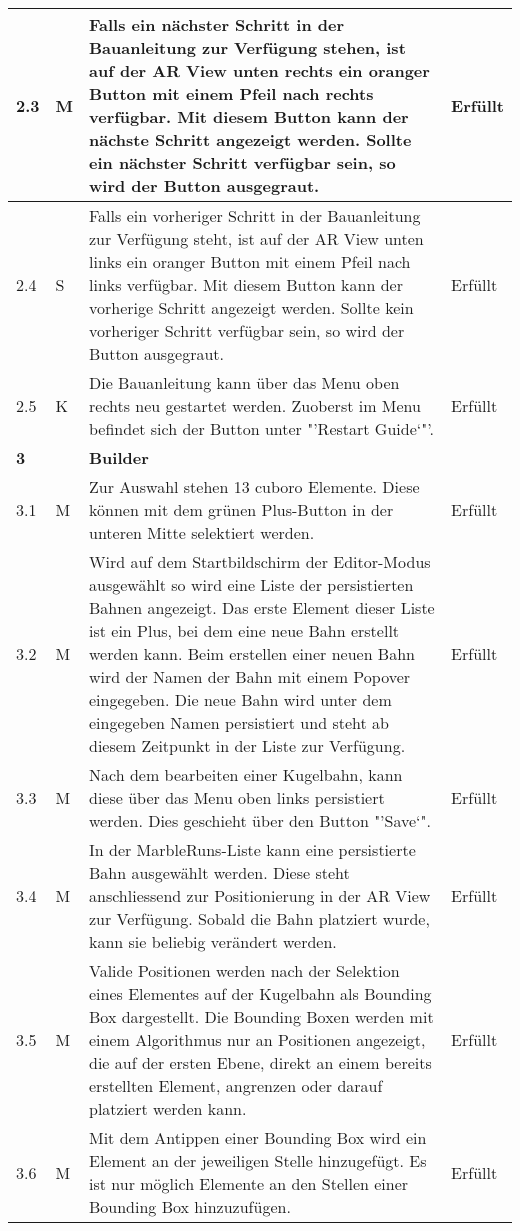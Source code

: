 \begin{longtable}{l l p{10cm} l}
	\hline
	2.3 & M & Falls ein nächster Schritt in der Bauanleitung zur Verfügung stehen, ist auf der AR View unten rechts ein oranger Button mit einem Pfeil nach rechts verfügbar. Mit diesem Button kann der nächste Schritt angezeigt werden. Sollte ein nächster Schritt verfügbar sein, so wird der Button ausgegraut. & Erfüllt \\
	\hline
	2.4 & S & Falls ein vorheriger Schritt in der Bauanleitung zur Verfügung steht, ist auf der AR View unten links ein oranger Button mit einem Pfeil nach links verfügbar. Mit diesem Button kann der vorherige Schritt angezeigt werden. Sollte kein vorheriger Schritt verfügbar sein, so wird der Button ausgegraut. & Erfüllt \\
	\hline
	2.5 & K & Die Bauanleitung kann über das Menu oben rechts neu gestartet werden. Zuoberst im Menu befindet sich der Button unter "'Restart Guide`"'. & Erfüllt \\
	\hline
	\textbf{3} & & \textbf{Builder} & \\
	\hline
	3.1 & M & Zur Auswahl stehen 13 cuboro Elemente. Diese können mit dem grünen Plus-Button in der unteren Mitte selektiert werden. & Erfüllt \\
	\hline
	3.2 & M & Wird auf dem Startbildschirm der Editor-Modus ausgewählt so wird eine Liste der persistierten Bahnen angezeigt. Das erste Element dieser Liste ist ein Plus, bei dem eine neue Bahn erstellt werden kann. Beim erstellen einer neuen Bahn wird der Namen der Bahn mit einem Popover eingegeben. Die neue Bahn wird unter dem eingegeben Namen persistiert und steht ab diesem Zeitpunkt in der Liste zur Verfügung. & Erfüllt \\
	\hline
	3.3 & M & Nach dem bearbeiten einer Kugelbahn, kann diese über das Menu oben links persistiert werden. Dies geschieht über den Button "'Save`". & Erfüllt \\
	\hline
	3.4 & M & In der MarbleRuns-Liste kann eine persistierte Bahn ausgewählt werden. Diese steht anschliessend zur Positionierung in der AR View zur Verfügung. Sobald die Bahn platziert wurde, kann sie beliebig verändert werden. & Erfüllt \\
	\hline
	3.5 & M & Valide Positionen werden nach der Selektion eines Elementes auf der Kugelbahn als Bounding Box dargestellt. Die Bounding Boxen werden mit einem Algorithmus nur an Positionen angezeigt, die auf der ersten Ebene, direkt an einem bereits erstellten Element, angrenzen oder darauf platziert werden kann. & Erfüllt \\
	\hline
	3.6 & M & Mit dem Antippen einer Bounding Box wird ein Element an der jeweiligen Stelle hinzugefügt. Es ist nur möglich Elemente an den Stellen einer Bounding Box hinzuzufügen. & Erfüllt \\

\end{longtable}
